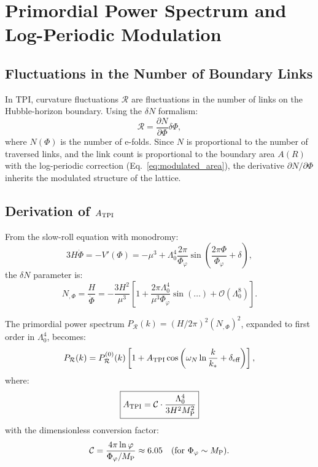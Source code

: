 \documentclass[11pt,a4paper]{article}
\theoremstyle{definition}
\begin{document}
\section{Primordial Power Spectrum and Log-Periodic Modulation}\label{sec:spectrum}

\subsection{Fluctuations in the Number of Boundary Links}

In TPI, curvature fluctuations $\mathcal{R}$ are fluctuations in the number of links on the Hubble-horizon boundary. Using the $\delta N$ formalism:
\begin{equation}
\mathcal{R} = \frac{\partial N}{\partial \Phi} \delta\Phi,
\end{equation}
where $N(\Phi)$ is the number of e-folds. Since $N$ is proportional to the number of traversed links, and the link count is proportional to the boundary area $A(R)$ with the log-periodic correction (Eq.~\ref{eq:modulated_area}), the derivative $\partial N/\partial \Phi$ inherits the modulated structure of the lattice.

\subsection{Derivation of $A_{\rm TPI}$}

From the slow-roll equation with monodromy:
\begin{equation}
3H\dot{\Phi} = -V'(\Phi) = -\mu^3 + \Lambda_0^4 \frac{2\pi}{\Phi_\varphi} \sin\left(\frac{2\pi\Phi}{\Phi_\varphi} + \delta\right),
\end{equation}
the $\delta N$ parameter is:
\begin{equation}
N_{,\Phi} = \frac{H}{\dot{\Phi}} = -\frac{3H^2}{\mu^3} \left[ 1 + \frac{2\pi\Lambda_0^4}{\mu^3\Phi_\varphi} \sin(\dots) + \mathcal{O}(\Lambda_0^8) \right].
\end{equation}

The primordial power spectrum $P_{\mathcal{R}}(k) = (H/2\pi)^2 (N_{,\Phi})^2$, expanded to first order in $\Lambda_0^4$, becomes:
\begin{equation}
P_{\mathcal{R}}(k) = P_{\mathcal{R}}^{(0)}(k) \left[ 1 + A_{\rm TPI} \cos\left( \omega_N \ln\frac{k}{k_*} + \delta_{\text{eff}} \right) \right],
\end{equation}
where:
\begin{equation}\label{eq:A_TPI}
\boxed{A_{\rm TPI} = \mathcal{C} \cdot \frac{\Lambda_0^4}{3H^2 M_{\rm P}^2}}
\end{equation}
with the dimensionless conversion factor:
\begin{equation}
\mathcal{C} = \frac{4\pi\ln\varphi}{\Phi_\varphi/M_{\rm P}} \approx 6.05 \quad (\text{for } \Phi_\varphi \sim M_{\rm P}).
\end{equation}
\end{document}
